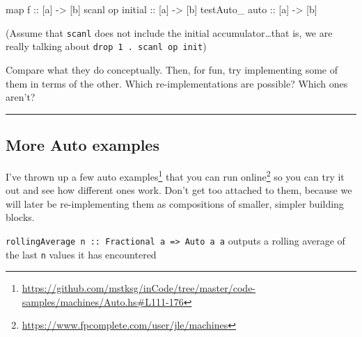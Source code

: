 \documentclass[]{article}
\newenvironment{Shaded}{}{}
\newcommand{\OtherTok}[1]{\textcolor[rgb]{0.00,0.44,0.13}{{#1}}}
\newcommand{\NormalTok}[1]{{#1}}
\renewcommand{\href}[2]{#2\footnote{\url{#1}}}
\begin{document}
\begin{Shaded}
\begin{Highlighting}[]
\NormalTok{map}\OtherTok{       f          ::} \NormalTok{[a] }\OtherTok{->} \NormalTok{[b]}
\NormalTok{scanl     op}\OtherTok{ initial ::} \NormalTok{[a] }\OtherTok{->} \NormalTok{[b]}
\NormalTok{testAuto_}\OtherTok{ auto       ::} \NormalTok{[a] }\OtherTok{->} \NormalTok{[b]}
\end{Highlighting}
\end{Shaded}

(Assume that \texttt{scanl} does not include the initial
accumulator\ldots{}that is, we are really talking about
\texttt{drop\ 1\ .\ scanl\ op\ init})

Compare what they do conceptually. Then, for fun, try implementing some
of them in terms of the other. Which re-implementations are possible?
Which ones aren't?

\begin{center}\rule{0.5\linewidth}{\linethickness}\end{center}

\subsection{More Auto examples}\label{more-auto-examples}

\href{https://github.com/mstksg/inCode/tree/master/code-samples/machines/Auto.hs\#L111-176}{I've
thrown up a few auto examples}
\href{https://www.fpcomplete.com/user/jle/machines}{that you can run
online} so you can try it out and see how different ones work. Don't get
too attached to them, because we will later be re-implementing them as
compositions of smaller, simpler building blocks.

\begin{description}
\tightlist
\item[\href{https://github.com/mstksg/inCode/tree/master/code-samples/machines/Auto.hs\#L111-122}{rollingAverage}]
\texttt{rollingAverage\ n\ ::\ Fractional\ a\ =\textgreater{}\ Auto\ a\ a}
outputs a rolling average of the last \texttt{n} values it has
encountered
\end{description}
\end{document}
